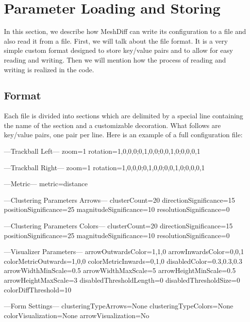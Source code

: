 \clearpage

\section{Parameter Loading and Storing}
\label{attch:parameter_load_store}

In this section, we describe how MeshDiff can write its configuration to a file and also read it from a file. First, we will talk about the file format. It is a very simple custom format designed to store key/value pairs and to allow for easy reading and writing. Then we will mention how the process of reading and writing is realized in the code.

\subsection{Format}
\label{attch:parameter_load_store-format}

Each file is divided into sections which are delimited by a special line containing the name of the section and a customizable decoration. What follows are key/value pairs, one pair per line. Here is an example of a full configuration file:

\begin{code}
---Trackball Left---
zoom=1
rotation=1,0,0,0;0,1,0,0;0,0,1,0;0,0,0,1

---Trackball Right---
zoom=1
rotation=1,0,0,0;0,1,0,0;0,0,1,0;0,0,0,1

---Metric---
metric=distance

---Clustering Parameters Arrows---
clusterCount=20
directionSignificance=15
positionSignificance=25
magnitudeSignificance=10
resolutionSignificance=0

---Clustering Parameters Colors---
clusterCount=20
directionSignificance=15
positionSignificance=25
magnitudeSignificance=10
resolutionSignificance=0

---Visualizer Parameters---
arrowOutwardsColor=1,1,0
arrowInwardsColor=0,0,1
colorMetricOutwards=1,0,0
colorMetricInwards=0,1,0
disabledColor=0.3,0.3,0.3
arrowWidthMinScale=0.5
arrowWidthMaxScale=5
arrowHeightMinScale=0.5
arrowHeightMaxScale=3
disabledThresholdLength=0
disabledThresholdSize=0
colorDiffThreshold=10

---Form Settings---
clusteringTypeArrows=None
clusteringTypeColors=None
colorVisualization=None
arrowVisualization=No
\end{code}

